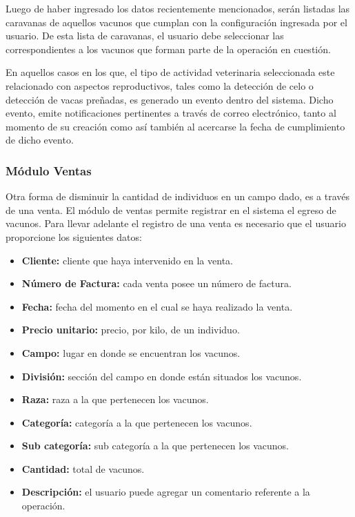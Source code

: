 \documentclass[11pt,oneside]{book}
\begin{document}
Luego de haber ingresado los datos recientemente mencionados, serán listadas las caravanas de aquellos vacunos que cumplan con la configuración ingresada por el usuario. De esta lista de caravanas, el usuario debe seleccionar las correspondientes a los vacunos que forman parte de la operación en cuestión.

En aquellos casos en los que, el tipo de actividad veterinaria seleccionada este relacionado con aspectos reproductivos, tales como la detección de celo o detección de vacas preñadas, es generado un evento dentro del sistema. Dicho evento, emite notificaciones pertinentes a través de correo electrónico, tanto al momento de su creación como así también al acercarse la fecha de cumplimiento de dicho evento.

\subsubsection{Módulo Ventas}
Otra forma de disminuir la cantidad de individuos en un campo dado, es a través de una venta. El módulo de ventas permite registrar en el sistema el egreso de vacunos. Para llevar adelante el registro de una venta es necesario que el usuario proporcione los siguientes datos:
\begin{itemize}
\item \textbf{Cliente:} cliente que haya intervenido en la venta.
\item \textbf{Número de Factura:} cada venta posee un número de factura. 
\item \textbf{Fecha:} fecha del momento en el cual se haya realizado la venta.
\item \textbf{Precio unitario:} precio, por kilo, de un individuo.
\item \textbf{Campo:} lugar en donde se encuentran los vacunos.
\item \textbf{División:} sección del campo en donde están situados los vacunos.
\item \textbf{Raza:} raza a la que pertenecen los vacunos.
\item \textbf{Categoría:} categoría a la que pertenecen los vacunos. 
\item \textbf{Sub categoría:} sub categoría a la que pertenecen los vacunos.
\item \textbf{Cantidad:} total de vacunos.
\item \textbf{Descripción:} el usuario puede agregar un comentario referente a la operación.
\end{itemize}
\end{document}
